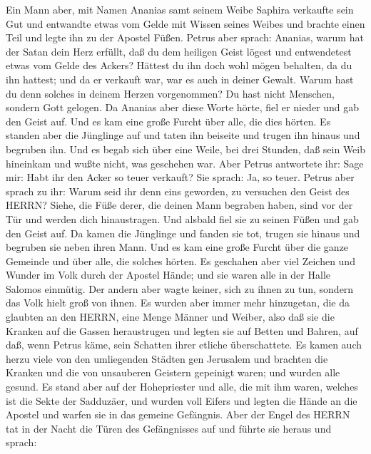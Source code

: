  Ein Mann aber, mit Namen Ananias samt seinem Weibe Saphira
verkaufte sein Gut  und entwandte etwas vom Gelde mit Wissen
seines Weibes und brachte einen Teil und legte ihn zu der Apostel Füßen.
 Petrus aber sprach: Ananias, warum hat der Satan dein Herz
erfüllt, daß du dem heiligen Geist lögest und entwendetest etwas vom
Gelde des Ackers?  Hättest du ihn doch wohl mögen behalten,
da du ihn hattest; und da er verkauft war, war es auch in deiner Gewalt.
Warum hast du denn solches in deinem Herzen vorgenommen? Du hast nicht
Menschen, sondern Gott gelogen.  Da Ananias aber diese Worte
hörte, fiel er nieder und gab den Geist auf. Und es kam eine große
Furcht über alle, die dies hörten.  Es standen aber die
Jünglinge auf und taten ihn beiseite und trugen ihn hinaus und begruben
ihn.  Und es begab sich über eine Weile, bei drei Stunden,
daß sein Weib hineinkam und wußte nicht, was geschehen war. 
Aber Petrus antwortete ihr: Sage mir: Habt ihr den Acker so teuer
verkauft? Sie sprach: Ja, so teuer.  Petrus aber sprach zu
ihr: Warum seid ihr denn eins geworden, zu versuchen den Geist des
HERRN? Siehe, die Füße derer, die deinen Mann begraben haben, sind vor
der Tür und werden dich hinaustragen.  Und alsbald fiel sie
zu seinen Füßen und gab den Geist auf. Da kamen die Jünglinge und fanden
sie tot, trugen sie hinaus und begruben sie neben ihren Mann.
 Und es kam eine große Furcht über die ganze Gemeinde und
über alle, die solches hörten.  Es geschahen aber viel
Zeichen und Wunder im Volk durch der Apostel Hände; und sie waren alle
in der Halle Salomos einmütig.  Der andern aber wagte
keiner, sich zu ihnen zu tun, sondern das Volk hielt groß von ihnen.
 Es wurden aber immer mehr hinzugetan, die da glaubten an
den HERRN, eine Menge Männer und Weiber,  also daß sie die
Kranken auf die Gassen heraustrugen und legten sie auf Betten und
Bahren, auf daß, wenn Petrus käme, sein Schatten ihrer etliche
überschattete.  Es kamen auch herzu viele von den
umliegenden Städten gen Jerusalem und brachten die Kranken und die von
unsauberen Geistern gepeinigt waren; und wurden alle gesund.
 Es stand aber auf der Hohepriester und alle, die mit ihm
waren, welches ist die Sekte der Sadduzäer, und wurden voll Eifers
 und legten die Hände an die Apostel und warfen sie in das
gemeine Gefängnis.  Aber der Engel des HERRN tat in der
Nacht die Türen des Gefängnisses auf und führte sie heraus und sprach:
